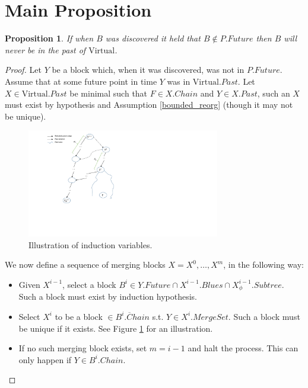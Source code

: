 \documentclass{article}
\theoremstyle{plain}
\newtheorem{proposition}[]{Proposition}
\theoremstyle{definition}
\theoremstyle{remark}
\newcommand{\virt}{\mbox{Virtual}}
\begin{document}
\section{Main Proposition}

\begin{proposition}\label{pruning}
   If when $B$ was discovered it held that $B\notin P.Future$ then $B$ will never be in the past of $\virt$.
\end{proposition}

\begin{proof}
    Let $Y$ be a block which, when it was discovered, was not in $P.Future$. Assume that at some future point in time $Y$ was in $\virt.Past$. Let $X\in \virt.Past$ be minimal such that $F\in X.Chain$ and $Y\in X.Past$, such an $X$ must exist by hypothesis and Assumption \ref{bounded_reorg} (though it may not be unique).
    
    \begin{figure}[h]
        \centering
        \includegraphics[width=0.75\textwidth, trim={3cm 5.5cm 18cm 0.5cm}, clip]{Pruning-Proof-Illustration.pdf}
        \caption{Illustration of induction variables.}
        \label{fig:induction}
    \end{figure}

    We now define a sequence of merging blocks $X = X^0,\ldots,X^m$, in the following way: 
    
    \begin{itemize}
        \item Given $X^{i-1}$, select a block $B^i \in Y.Future \cap X^{i-1}.Blues \cap X^{i-1}_\phi.Subtree $. Such a block must exist by induction hypothesis.
        \item Select $X^{i}$ to be a block $\in B^i.\overline{C}hain$ s.t. $Y \in X^{i}.MergeSet$. Such a block must be unique if it exists. See Figure \ref{fig:induction} for an illustration. 
        \item If no such merging block exists, set $m = i-1$ and halt the process. This can only happen if $Y \in B^i.Chain$.
    \end{itemize}
    

\end{proof}
\end{document}
